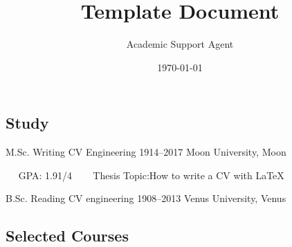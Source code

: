 \documentclass{article}
\title{Template Document}
\author{Academic Support Agent}
\date{\today}
\begin{document}
\maketitle

\makefrontsidebar



\subsection{Study}
\begin{cvtable}[1.5]
	\Educvitem
            {\faGraduationCap}
            {M.Sc. Writing CV Engineering}
            {1914--2017}
            {Moon University, Moon}
    	{ }

            \Shortcustomcvitem
            {~~}
            {GPA:}
            {1.91/4}
            \Shortcustomcvitem
            {~~}
            {~Thesis Topic:}{How to write a CV with \LaTeX}
            
        \Educvitem
            {\faGraduationCap}
            {B.Sc. Reading CV engineering}
            {1908--2013}
            {Venus University, Venus}
            {}
\end{cvtable}


\subsection{Selected Courses}
\end{document}

